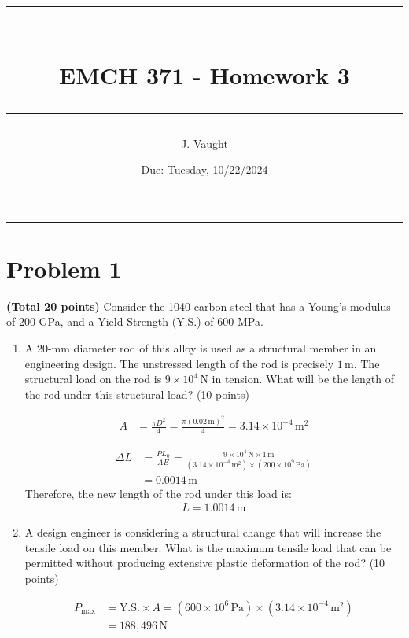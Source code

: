 \documentclass[10pt]{article}
\title{\vspace{-2cm}\hrule\vspace{0.5cm}\\EMCH 371 - Homework 3 \vspace{0.5cm}\hrule}
\author{\vspace{-1cm}J. Vaught}
\date{\vspace{-0.2cm}Due: Tuesday, 10/22/2024}
\begin{document}
\maketitle

\vspace{-0.4cm}
\hrule
\vspace{0.5cm}

\section*{Problem 1}

\noindent \textbf{(Total 20 points)} Consider the 1040 carbon steel that has a Young's modulus of 200 GPa, and a Yield Strength (Y.S.) of 600 MPa.

\begin{enumerate}
    \item[(a)] A 20-mm diameter rod of this alloy is used as a structural member in an engineering design. The unstressed length of the rod is precisely \(1 \, \text{m}\). The structural load on the rod is \(9 \times 10^4 \, \text{N}\) in tension. What will be the length of the rod under this structural load? (10 points)

    \begin{align*}
        A &= \frac{\pi D^2}{4} = \frac{\pi (0.02 \, \text{m})^2}{4} = 3.14 \times 10^{-4} \, \text{m}^2
    \end{align*}

    \begin{align*}
        \Delta L &= \frac{P L_0}{A E} = \frac{9 \times 10^4 \, \text{N} \times 1 \, \text{m}}{(3.14 \times 10^{-4} \, \text{m}^2) \times (200 \times 10^9 \, \text{Pa})} \\
        &= 0.0014 \, \text{m}
    \end{align*}
\noindent
    Therefore, the new length of the rod under this load is:
    \begin{align*}
        L = 1.0014 \, \text{m}
    \end{align*}

    \item[(b)] A design engineer is considering a structural change that will increase the tensile load on this member. What is the maximum tensile load that can be permitted without producing extensive plastic deformation of the rod? (10 points)

    \begin{align*}
        P_{\text{max}} &= \text{Y.S.} \times A = (600 \times 10^6 \, \text{Pa}) \times (3.14 \times 10^{-4} \, \text{m}^2) \\
        &= 188,496 \, \text{N}
    \end{align*}
\end{enumerate}
\end{document}
